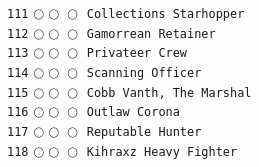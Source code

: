 \documentclass[a4paper,landscape]{article}
\begin{document}
\begin{multicols*}{5}
\texttt{111} \(\bigcirc\!\bigcirc\!\bigcirc\)  \texttt{Collections Starhopper} \vspace{-0.3mm}\\ 
\texttt{112} \(\bigcirc\!\bigcirc\!\bigcirc\)  \texttt{Gamorrean Retainer} \vspace{-0.3mm}\\ 
\texttt{113} \(\bigcirc\!\bigcirc\!\bigcirc\)  \texttt{Privateer Crew} \vspace{-0.3mm}\\ 
\texttt{114} \(\bigcirc\!\bigcirc\!\bigcirc\)  \texttt{Scanning Officer} \vspace{-0.3mm}\\ 
\texttt{115} \(\bigcirc\!\bigcirc\!\bigcirc\)  \texttt{Cobb Vanth, The Marshal} \vspace{-0.3mm}\\ 
\texttt{116} \(\bigcirc\!\bigcirc\!\bigcirc\)  \texttt{Outlaw Corona} \vspace{-0.3mm}\\ 
\texttt{117} \(\bigcirc\!\bigcirc\!\bigcirc\)  \texttt{Reputable Hunter} \vspace{-0.3mm}\\ 
\texttt{118} \(\bigcirc\!\bigcirc\!\bigcirc\)  \texttt{Kihraxz Heavy Fighter} \vspace{-0.3mm}\\ 

\end{multicols*}
\end{document}
